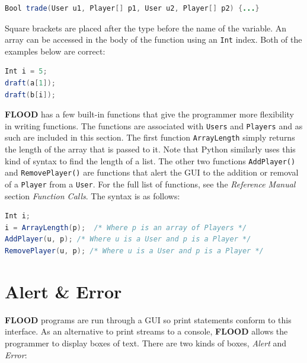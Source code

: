 \documentclass[12pt]{report}
\begin{document}
\begin{singlespace}
\begin{lstlisting}[language=Java,label=some-code,caption=Passing User and Player arrays]
Bool trade(User u1, Player[] p1, User u2, Player[] p2) {...}
\end{lstlisting}
\end{singlespace}

Square brackets are placed after the type before the name of the variable. An array can be accessed in the body of the function using an \texttt{Int} index. Both of the examples below are correct:

\begin{singlespace}
\begin{lstlisting}[language=Java,label=some-code,caption=Assessing array elements using index]
Int i = 5;
draft(a[1]);
draft(b[i]);
\end{lstlisting}
\end{singlespace}

\textbf{FLOOD} has a few built-in functions that give the programmer more flexibility in writing functions. The functions are associated with \texttt{Users} and \texttt{Players} and as such are included in this section. The first function \texttt{ArrayLength} simply returns the length of the array that is passed to it. Note that Python similarly uses this kind of syntax to find the length of a list. The other two functions \texttt{AddPlayer()} and \texttt{RemovePlayer()} are functions that alert the GUI to the addition or removal of a \texttt{Player} from a \texttt{User}. For the full list of functions, see the \textit{Reference Manual} section \textit{Function Calls}. The syntax is as follows:

\begin{singlespace}
\begin{lstlisting}[language=Java,label=some-code,caption=Some FLOOD utility functions and usage]
Int i;
i = ArrayLength(p);  /* Where p is an array of Players */
AddPlayer(u, p); /* Where u is a User and p is a Player */
RemovePlayer(u, p); /* Where u is a User and p is a Player */
\end{lstlisting}
\end{singlespace}

\section{Alert \& Error}

\textbf{FLOOD} programs are run through a GUI so print statements conform to this interface. As an alternative to print streams to a console, \textbf{FLOOD} allows the programmer to display boxes of text. There are two kinds of boxes, \textit{Alert} and \textit{Error}:
\end{document}

